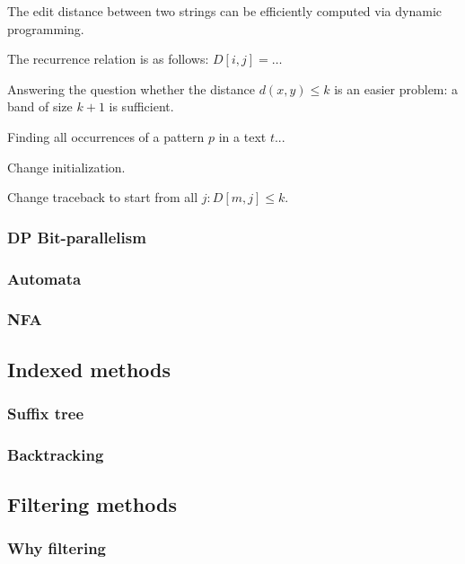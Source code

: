 The edit distance between two strings can be efficiently computed via dynamic programming.

The recurrence relation is as follows: $D[i,j] = \dots$

Answering the question whether the distance $d(x,y) \leq k$ is an easier problem: a band of size $k+1$ is sufficient.

Finding all occurrences of a pattern $p$ in a text $t$...

Change initialization.

Change traceback to start from all $j : D[m,j] \leq k$.


\subsubsection{DP Bit-parallelism}


\subsubsection{Automata}

\subsubsection{NFA}



\subsection{Indexed methods}

\subsubsection{Suffix tree}

\subsubsection{Backtracking}


\subsection{Filtering methods}

\subsubsection{Why filtering}

